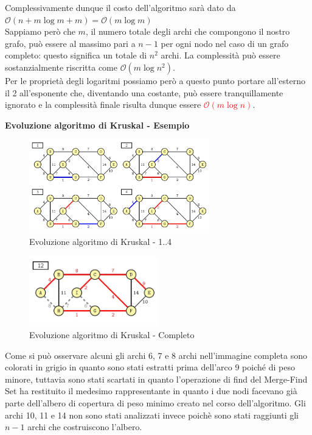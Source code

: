 \documentclass[../cheatSheetAlgoritmi.tex]{subfiles}
\begin{document}
Complessivamente dunque il costo dell'algoritmo sarà dato da $\mathcal{O}(n + m \log m + m) = \mathcal{O}(m \log m)$\\
Sappiamo però che $m$, il numero totale degli archi che compongono il nostro grafo, può essere al massimo pari a $n-1$ per ogni nodo nel caso di un grafo completo: questo significa un totale di $n^{2}$ archi. La complessità può essere sostanzialmente riscritta come $\mathcal{O}(m \log n^{2})$.\\
Per le proprietà degli logaritmi possiamo però a questo punto portare all'esterno il 2 all'esponente che, diventando una costante, può essere tranquillamente ignorato e la complessità finale risulta dunque essere \textcolor{red}{$\mathcal{O}(m \log n)$}.
\newpage
\begin{flushleft}
\textbf{Evoluzione algoritmo di Kruskal - Esempio}
\end{flushleft}
\begin{figure}[h]
	\centering
	\includegraphics[width=0.7\textwidth]{../img/Greedy_7.jpg}
	\caption{Evoluzione algoritmo di Kruskal - 1..4}
\end{figure}
\begin{figure}[h]
	\centering
	\includegraphics[width=0.5\textwidth]{../img/Greedy_8.jpg}
	\caption{Evoluzione algoritmo di Kruskal - Completo}
\end{figure}
Come si può osservare alcuni gli archi 6, 7 e 8 archi nell'immagine completa sono colorati in grigio in quanto sono stati estratti prima dell'arco 9 poiché di peso minore, tuttavia sono stati scartati in quanto l'operazione di find del Merge-Find Set ha restituito il medesimo rappresentante in quanto i due nodi facevano già parte dell'albero di copertura di peso minimo creato nel corso dell'algoritmo. Gli archi 10, 11 e 14 non sono stati analizzati invece poichè sono stati raggiunti gli $n-1$ archi che costruiscono l'albero.
\newpage
\end{document}
